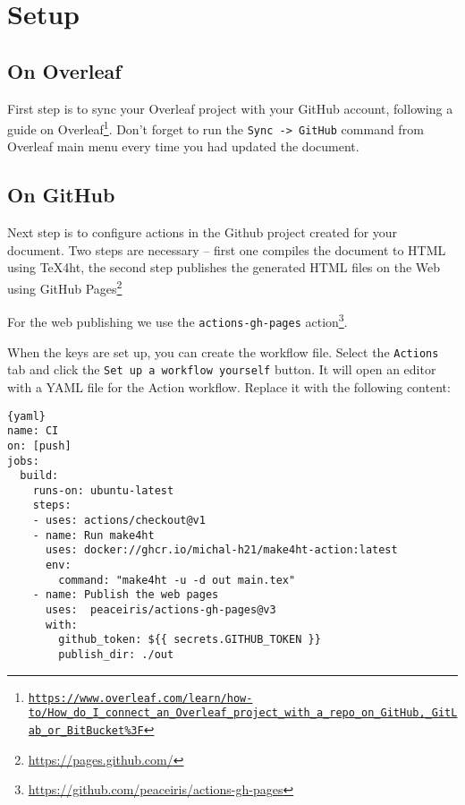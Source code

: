 \documentclass{article}
\newcommand{\1}{\mathbbm{1}}
\newcommand{\cmdname}[1]{\texttt{#1}}
\newcommand\footurl[1]{\footnote{\url{#1}}}
\newcommand\urllink[2]{#1\footurl{#2}}
\newcommand\foothref[3]{#1\footnote{\href{#2}{#3}}}
\begin{document}
\section{Setup}

\subsection{On Overleaf}

First step is to sync your Overleaf project with your GitHub account, following \foothref{a guide on 
  Overleaf}{https://www.overleaf.com/learn/how-to/How_do_I_connect_an_Overleaf_project_with_a_repo_on_GitHub,_GitLab_or_BitBucket\%3F}
{\texttt{https://www.overleaf.com/learn/how-to/How\_do\_I\_connect\_an\_Overleaf\_project\_with\_a\allowbreak\_repo\_on\_GitHub,\_GitLab\_or\_BitBucket\%3F}}. 
Don't forget to run the \cmdname{Sync -> GitHub} command from Overleaf main menu every time you had updated the document.

\subsection{On GitHub}
Next step is to configure actions in the Github project created for your
document. Two steps are necessary -- first  one compiles the document to HTML
using \TeX4ht, the second step publishes the generated HTML files on the Web
using \urllink{GitHub Pages}{https://pages.github.com/}

For the web publishing we  use the \verb|actions-gh-pages|
\urllink{action}{https://github.com/peaceiris/actions-gh-pages}. 

When the keys are set up, you can create the workflow file. Select the
\cmdname{Actions} tab and click the \cmdname{Set up a workflow yourself}
button. It will open an editor with a YAML file for the Action workflow.
Replace it with the following content:


\begin{lstlisting}{yaml}
name: CI
on: [push]
jobs:
  build:
    runs-on: ubuntu-latest
    steps:
    - uses: actions/checkout@v1
    - name: Run make4ht
      uses: docker://ghcr.io/michal-h21/make4ht-action:latest
      env:
        command: "make4ht -u -d out main.tex"
    - name: Publish the web pages
      uses:  peaceiris/actions-gh-pages@v3
      with:
        github_token: ${{ secrets.GITHUB_TOKEN }}
        publish_dir: ./out
\end{lstlisting}
\end{document}
